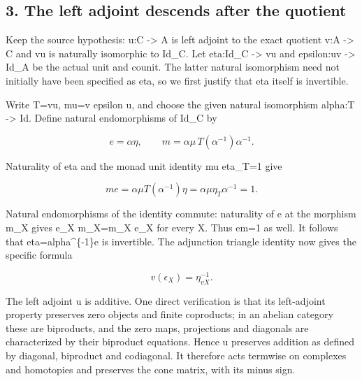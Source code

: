 \subsection{3. The left adjoint descends after the quotient}\label{proofs-5910-6199-the-left-adjoint-descends-after-the-quotient}

Keep the source hypothesis:\allowbreak{} u:\allowbreak{}C \allowbreak{}-> A is left adjoint to the exact quotient v:\allowbreak{}A \allowbreak{}-> C and vu is naturally isomorphic to Id\_\allowbreak{}C. Let eta:\allowbreak{}Id\_\allowbreak{}C \allowbreak{}-> vu and epsilon:\allowbreak{}uv \allowbreak{}-> Id\_\allowbreak{}A be the actual unit and counit. The latter natural isomorphism need not initially have been specified as eta,\allowbreak{} so we first justify that eta itself is invertible.

Write T\allowbreak{}=vu,\allowbreak{} mu\allowbreak{}=v epsilon u,\allowbreak{} and choose the given natural isomorphism alpha:\allowbreak{}T \allowbreak{}-> Id. Define natural endomorphisms of Id\_\allowbreak{}C by

\[
 e=\alpha\eta,\qquad
 m=\alpha\mu\,T(\alpha^{-1})\alpha^{-1}.                 \tag{3.1}
\]

Naturality of eta and the monad unit identity mu eta\_\allowbreak{}T\allowbreak{}=1 give

\[
 me=\alpha\mu T(\alpha^{-1})\eta
    =\alpha\mu\eta_T\alpha^{-1}=1.
\]

Natural endomorphisms of the identity commute:\allowbreak{} naturality of e at the morphism m\_\allowbreak{}X gives e\_\allowbreak{}X m\_\allowbreak{}X\allowbreak{}=m\_\allowbreak{}X e\_\allowbreak{}X for every X. Thus em\allowbreak{}=1 as well. It follows that eta\allowbreak{}=alpha\textasciicircum{}\{-1\}e is invertible. The adjunction triangle identity now gives the specific formula

\[
 v(\epsilon_X)=\eta_{vX}^{-1}.                            \tag{3.2}
\]

The left adjoint u is additive. One direct verification is that its left-adjoint property preserves zero objects and finite coproducts; in an abelian category these are biproducts,\allowbreak{} and the zero maps,\allowbreak{} projections and diagonals are characterized by their biproduct equations. Hence u preserves addition as defined by diagonal,\allowbreak{} biproduct and codiagonal. It therefore acts termwise on complexes and homotopies and preserves the cone matrix,\allowbreak{} with its minus sign.

